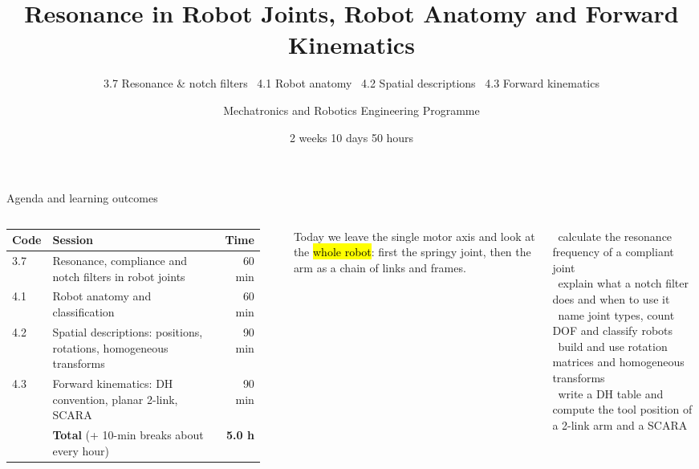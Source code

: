 \documentclass[aspectratio=169,10pt]{beamer}
\title[W2D1 -- Resonance \& Kinematics]{Resonance in Robot Joints, Robot Anatomy and Forward Kinematics}
\subtitle{3.7 Resonance \& notch filters \textbullet\ 4.1 Robot anatomy \textbullet\ 4.2 Spatial descriptions \textbullet\ 4.3 Forward kinematics}
\author{Mechatronics and Robotics Engineering Programme}
\institute{Week 2 \textperiodcentered{} Day 1}
\date{2 weeks \textperiodcentered{} 10 days \textperiodcentered{} 50 hours}
\begin{document}
\begin{frame}[plain]\titlepage\end{frame}

\begin{frame}[t]{Agenda and learning outcomes}
\begin{columns}[T,onlytextwidth]
\footnotesize
\begin{tabularx}{\linewidth}{@{}l X r@{}}
\toprule
\textbf{Code} & \textbf{Session} & \textbf{Time}\\
\midrule
3.7 & Resonance, compliance and notch filters in robot joints & 60 min\\
4.1 & Robot anatomy and classification & 60 min\\
4.2 & Spatial descriptions: positions, rotations, homogeneous transforms & 90 min\\
4.3 & Forward kinematics: DH convention, planar 2-link, SCARA & 90 min\\
\midrule
 & \textbf{Total} (+ 10-min breaks about every hour) & \textbf{5.0 h}\\
\bottomrule
\end{tabularx}\\[2mm]
\begin{notebox}
\small Today we leave the single motor axis and look at the \hl{whole robot}: first the springy joint, then the arm as a chain of links and frames.
\end{notebox}
\begin{keybox}
\small
\checkitem\ calculate the resonance frequency of a compliant joint\\
\checkitem\ explain what a notch filter does and when to use it\\
\checkitem\ name joint types, count DOF and classify robots\\
\checkitem\ build and use rotation matrices and homogeneous transforms\\
\checkitem\ write a DH table and compute the tool position of a 2-link arm and a SCARA
\end{keybox}
\end{columns}
\end{frame}
\end{document}
